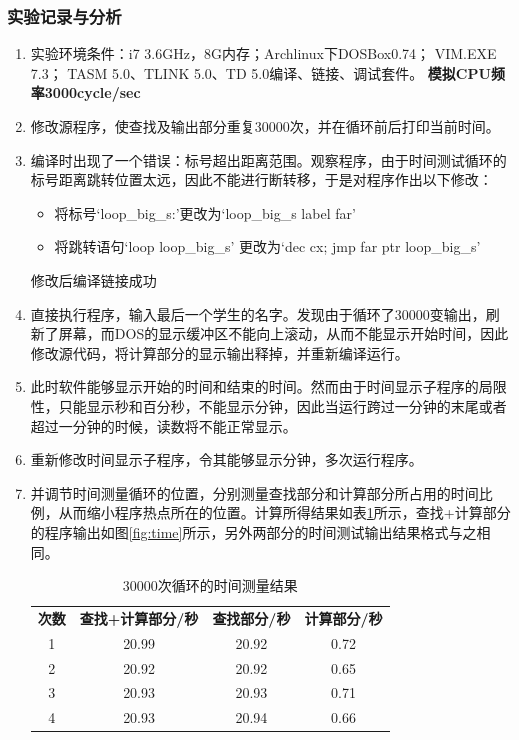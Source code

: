 \documentclass{article}
\begin{document}
	\subsubsection{实验记录与分析}
	\begin{enumerate}
		\item 实验环境条件：i7 3.6GHz，8G内存；Archlinux下DOSBox0.74； VIM.EXE 7.3； TASM 5.0、TLINK 5.0、TD 5.0编译、链接、调试套件。 {\textbf{模拟CPU频率3000cycle/sec}}
		\item 修改源程序，使查找及输出部分重复30000次，并在循环前后打印当前时间。
		\item 编译时出现了一个错误：标号超出距离范围。观察程序，由于时间测试循环的标号距离跳转位置太远，因此不能进行断转移，于是对程序作出以下修改：
			\begin{itemize}
				\item 将标号`loop\_big\_s:'更改为`loop\_big\_s label far'
				\item 将跳转语句`loop loop\_big\_s' 更改为`dec cx;	jmp far ptr loop\_big\_s'
			\end{itemize}
			修改后编译链接成功
		\item 直接执行程序，输入最后一个学生的名字。发现由于循环了30000变输出，刷新了屏幕，而DOS的显示缓冲区不能向上滚动，从而不能显示开始时间，因此修改源代码，将计算部分的显示输出释掉，并重新编译运行。
		\item 此时软件能够显示开始的时间和结束的时间。然而由于时间显示子程序的局限性，只能显示秒和百分秒，不能显示分钟，因此当运行跨过一分钟的末尾或者超过一分钟的时候，读数将不能正常显示。
		\item 重新修改时间显示子程序，令其能够显示分钟，多次运行程序。
		\item 并调节时间测量循环的位置，分别测量查找部分和计算部分所占用的时间比例，从而缩小程序热点所在的位置。计算所得结果如表\ref{tab:table1}所示，查找+计算部分的程序输出如图\ref{fig:time}所示，另外两部分的时间测试输出结果格式与之相同。
			\begin{table}[H]
				\centering
				\caption{30000次循环的时间测量结果}
				\label{tab:table1}
				\begin{tabular}{c c c c}
					\toprule
					{\bfseries 次数} & {\bfseries 查找+计算部分/秒} & {\bfseries 查找部分/秒} & {\bfseries 计算部分/秒} \\
					\cmidrule(lr){1-1}\cmidrule(lr){2-4}
					1 & 20.99 & 20.92 & 0.72 \\
					2 & 20.92 & 20.92 & 0.65 \\
					3 & 20.93 & 20.93 & 0.71 \\
					4 & 20.93 & 20.94 & 0.66 \\

\end{tabular}
\end{table}
\end{enumerate}
\end{document}
